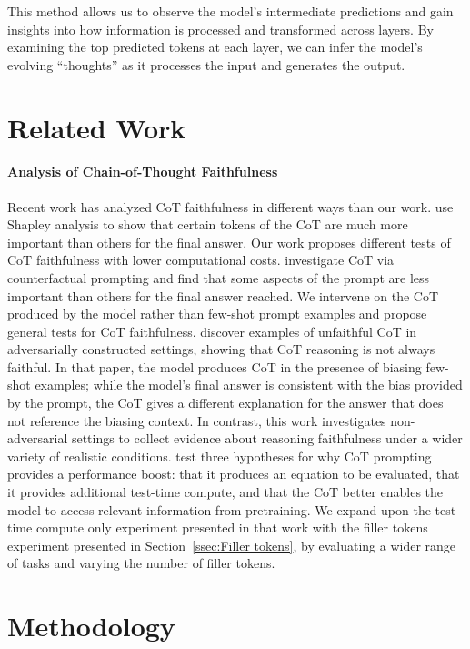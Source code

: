 \documentclass{article}
\begin{document}
This method allows us to observe the model's intermediate predictions and gain insights into how information is processed and transformed across layers. By examining the top predicted tokens at each layer, we can infer the model's evolving ``thoughts'' as it processes the input and generates the output.

\clearpage
\section{Related Work}

\paragraph{Analysis of Chain-of-Thought Faithfulness}
Recent work has analyzed CoT faithfulness in different ways than our work. 
\citet{gao2023shapley} use Shapley analysis to show that certain tokens of the CoT are much more important than others for the final answer. 
Our work proposes different tests of CoT faithfulness with lower computational costs.
\citet{madaan2022text} investigate CoT via counterfactual prompting and find that some aspects of the prompt are less important than others for the final answer reached.
We intervene on the CoT produced by the model rather than few-shot prompt examples and propose general tests for CoT faithfulness.
\citet{turpin2023language} discover examples of unfaithful CoT in adversarially constructed settings, showing that CoT reasoning is not always faithful. In that paper, the model produces CoT in the presence of biasing few-shot examples; while the model's final answer is consistent with the bias provided by the prompt, the CoT gives a different explanation for the answer that does not reference the biasing context. 
In contrast, this work investigates non-adversarial settings to collect evidence about reasoning faithfulness under a wider variety of realistic conditions.
\citet{wei2022chain} test three hypotheses for why CoT prompting provides a performance boost: that it produces an equation to be evaluated, that it provides additional test-time compute, and that the CoT better enables the model to access relevant information from pretraining. We expand upon the test-time compute only experiment presented in that work with the filler tokens experiment presented in Section~\ref{ssec:Filler tokens}, by evaluating a wider range of tasks and varying the number of filler tokens.

\section{Methodology}
\end{document}
